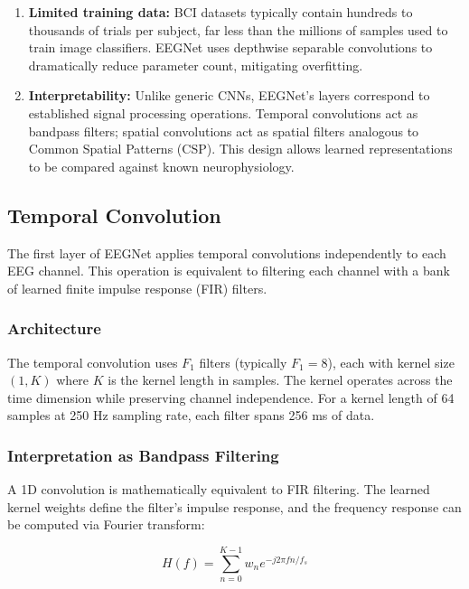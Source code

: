\begin{enumerate}
    \item \textbf{Limited training data:} BCI datasets typically contain hundreds to thousands of trials per subject, far less than the millions of samples used to train image classifiers. EEGNet uses depthwise separable convolutions to dramatically reduce parameter count, mitigating overfitting.
    
    \item \textbf{Interpretability:} Unlike generic CNNs, EEGNet's layers correspond to established signal processing operations. Temporal convolutions act as bandpass filters; spatial convolutions act as spatial filters analogous to Common Spatial Patterns (CSP). This design allows learned representations to be compared against known neurophysiology.
\end{enumerate}


\subsection{Temporal Convolution}
\label{subsec:bg_eegnet_temporal}

The first layer of EEGNet applies temporal convolutions independently to each EEG channel. This operation is equivalent to filtering each channel with a bank of learned finite impulse response (FIR) filters.

\subsubsection{Architecture}

The temporal convolution uses $F_1$ filters (typically $F_1 = 8$), each with kernel size $(1, K)$ where $K$ is the kernel length in samples. The kernel operates across the time dimension while preserving channel independence. For a kernel length of 64 samples at 250 Hz sampling rate, each filter spans 256 ms of data.

\subsubsection{Interpretation as Bandpass Filtering}

A 1D convolution is mathematically equivalent to FIR filtering. The learned kernel weights define the filter's impulse response, and the frequency response can be computed via Fourier transform:

\begin{equation}
    H(f) = \sum_{n=0}^{K-1} w_n e^{-j 2\pi f n / f_s}
    \label{eq:freq_response}
\end{equation}

